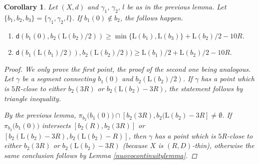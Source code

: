 \documentclass[10pt]{article}
\newtheorem{corollary}[thm]{Corollary}
\theoremstyle{definition}
\newcommand{\length}{\mathrm{L}}
\newcommand{\sd}{\mathsf{d}}
\begin{document}
    \begin{corollary} \label{C5}
        Let $(X,d)$ and $\gamma_1, \, \gamma_2, \,l$ be as in the previous lemma. Let $\{b_1,b_2,b_3\}=\{\gamma_1,\gamma_2,l\}$. If $b_1(0) \notin b_2$, the follows happen.
        \begin{enumerate}
        \item
        $
\sd(b_1(0),b_2(\length(b_2)/2))
        \geq 
        \min \{\length(b_1),\length(b_3)\}+\length(b_2)/2-10R.
        $
        \item $
\sd(b_1(\length(b_1)/2)),b_2(\length(b_2)/2))
        \geq 
        \length(b_1)/2+\length(b_2)/2-10R.
        $
        \end{enumerate}
        \begin{proof}
        We only prove the first point, the proof of the second one being analogous.
            Let $\gamma$ be a segment connecting $b_1(0)$ and $b_2(\length(b_2)/2)$. If $\gamma$ has a point which is $5R$-close to either $b_2(3R)$ or $b_2(\length(b_2)-3R)$, the statement follows by triangle inequality.

            By the previous lemma, $\pi_{b_2}\big(b_1(0)\big) \cap [b_2(3R),b_2(\length(b_2)-3R] \neq \emptyset$. If $\pi_{b_2}\big(b_1(0)\big) $ intersects $[b_2(R),b_2(3R)]$ or $[b_2(\length(b_2)-3R),b_2(\length(b_2)-R)]$, then $\gamma$ has a point which is $5R$-close to either $b_2(3R)$ or $b_2(\length(b_2)-3R)$ (because $X$ is $(R,D)$-thin), otherwise the same conclusion follows by Lemma \ref{nuovocontinuitylemma}.
        \end{proof}
    \end{corollary}
\end{document}
